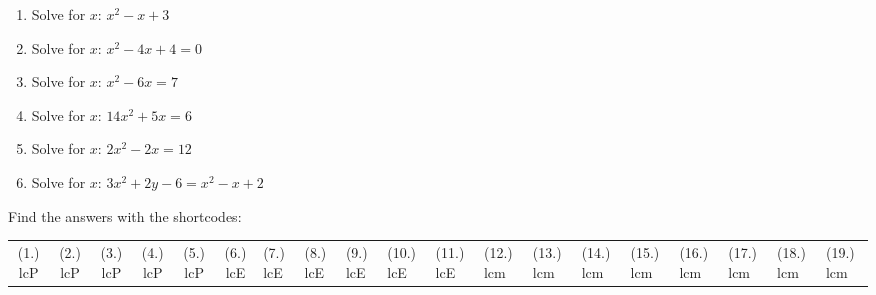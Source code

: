\begin{enumerate}[noitemsep, label=\textbf{\arabic*}. ]
\label{m39247*uid58}\item Solve for $x$: ${x}^{2}-x+3$\hspace{1ex}\hspace{1ex}        
\label{m39247*uid59}\item Solve for $x$: ${x}^{2}-4x+4=0$\hspace{1ex}        \label{m39247*uid60}\item Solve for $x$: ${x}^{2}-6x=7$\hspace{1ex}        
\label{m39247*uid61}\item Solve for $x$: $14{x}^{2}+5x=6$\hspace{1ex}        
\label{m39247*uid62}\item Solve for $x$: $2{x}^{2}-2x=12$\hspace{1ex}        
\label{m39247*uid63}\item Solve for $x$: $3{x}^{2}+2y-6={x}^{2}-x+2$\hspace{1ex}        
\end{enumerate}
\label{m39247**end}
\par {} Find the answers with the shortcodes:
 \par \begin{tabular}[h]{cccccc}
 (1.) lcP  &  (2.) lcP  &  (3.) lcP  &  (4.) lcP  &  (5.) lcP  &  (6.) lcE  &  (7.) lcE  &  (8.) lcE  &  (9.) lcE  &  (10.) lcE  &  (11.) lcE  &  (12.) lcm  &  (13.) lcm  &  (14.) lcm  &  (15.) lcm  &  (16.) lcm  &  (17.) lcm  &  (18.) lcm  &  (19.) lcm  & \end{tabular}
%     
%     
